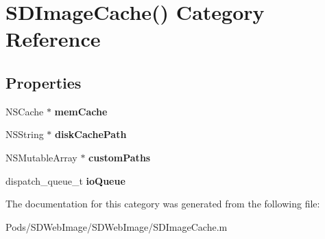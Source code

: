 \hypertarget{category_s_d_image_cache_07_08}{}\section{S\+D\+Image\+Cache() Category Reference}
\label{category_s_d_image_cache_07_08}
\subsection*{Properties}
\begin{DoxyCompactItemize}
\item 
\mbox{\label{category_s_d_image_cache_07_08_a92cbea5e90d14300f1eaeea352f3cd7d}} 
N\+S\+Cache $\ast$ {\bfseries mem\+Cache}
\item 
\mbox{\label{category_s_d_image_cache_07_08_a02cb42a09ea25a55f3dd90fae45ff940}} 
N\+S\+String $\ast$ {\bfseries disk\+Cache\+Path}
\item 
\mbox{\label{category_s_d_image_cache_07_08_a00aa52acc3e69fd53f1ab1b713907525}} 
N\+S\+Mutable\+Array $\ast$ {\bfseries custom\+Paths}
\item 
\mbox{\label{category_s_d_image_cache_07_08_a03fcaa98908cd1f3fcc7a6b09be6c028}} 
dispatch\+\_\+queue\+\_\+t {\bfseries io\+Queue}
\end{DoxyCompactItemize}


The documentation for this category was generated from the following file\+:\begin{DoxyCompactItemize}
\item 
Pods/\+S\+D\+Web\+Image/\+S\+D\+Web\+Image/S\+D\+Image\+Cache.\+m\end{DoxyCompactItemize}
